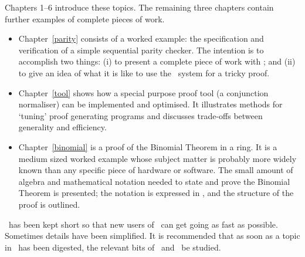 Chapters 1--6 introduce these topics. The remaining three chapters
contain further examples of complete pieces of work.
\begin{itemize}
\item Chapter~\ref{parity} consists of a worked example: the
  specification and verification of a simple sequential parity
  checker.  The intention is to accomplish two things: (i) to present
  a complete piece of work with \HOL; and (ii) to give an idea of what
  it is like to use the \HOL\ system for a tricky proof.

\item Chapter~\ref{tool} shows how a special purpose proof tool (a
  conjunction normaliser) can be implemented and optimised. It
  illustrates methods for `tuning' proof generating programs and
  discusses trade-offs between generality and efficiency.

\item Chapter~\ref{binomial} is a proof of the Binomial Theorem in a
  ring.  It is a medium sized worked example whose subject matter is
  probably more widely known than any specific piece of hardware or
  software. The small amount of algebra and mathematical notation
  needed to state and prove the Binomial Theorem is presented; the
  notation is expressed in \HOL{}, and the structure of the proof is
  outlined.

\end{itemize}

\noindent
\TUTORIAL\ has been kept short so that new users of \HOL\ can get
going as fast as possible. Sometimes details have been simplified. It
is recommended that as soon as a topic in \TUTORIAL\ has been
digested, the relevant bits of \DESCRIPTION\ and \REFERENCE\ be
studied.

